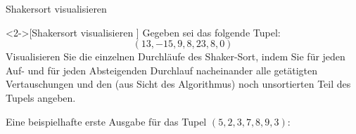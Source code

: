 \def\XList#1{
\foreach[count=\i,remember=\i as \li(initially 0)] \n in {#1}{
    \node[inner sep=4pt,draw,rounded rectangle,minimum width=3.5em,outer sep=2pt] (\i) at(4em*\i,0) {\strut\n};
    \ifnum\i>1
        \draw (\li.east) -- (\i.west);
    \fi
}}
\begin{frame}[c]{Shakersort visualisieren}
    \begin{exercise}<2->[Shakersort visualisieren ]
        \pause{}Gegeben sei das folgende Tupel: \begin{equation*}
            (13, -15, 9, 8, 23, 8, 0)
        \end{equation*}
        Visualisieren Sie die einzelnen Durchläufe des Shaker-Sort, indem Sie für jeden Auf- und für jeden Absteigenden Durchlauf nacheinander alle getätigten Vertauschungen und den (aus Sicht des Algorithmus) noch unsortierten Teil des Tupels angeben.\medskip\par
        Eine beispielhafte erste Ausgabe für das Tupel \((5, 2, 3, 7, 8, 9, 3)\):
        \begin{center}
        \end{center}
    \end{exercise}
\end{frame}

